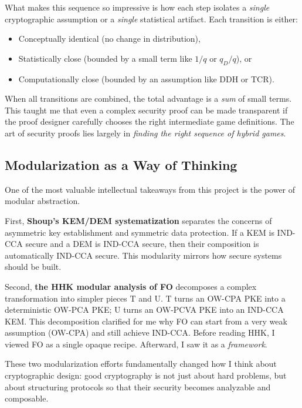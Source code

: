 What makes this sequence so impressive is how each step isolates a \textit{single} cryptographic assumption or a \textit{single} statistical artifact. Each transition is either:
\begin{itemize}
    \item Conceptually identical (no change in distribution),
    \item Statistically close (bounded by a small term like $1/q$ or $q_D/q$), or
    \item Computationally close (bounded by an assumption like DDH or TCR).
\end{itemize}

When all transitions are combined, the total advantage is a \textit{sum} of small terms. This taught me that even a complex security proof can be made transparent if the proof designer carefully chooses the right intermediate game definitions. The art of security proofs lies largely in \textit{finding the right sequence of hybrid games}.

\subsection{Modularization as a Way of Thinking}

One of the most valuable intellectual takeaways from this project is the power of modular abstraction.

First, \textbf{Shoup's KEM/DEM systematization} separates the concerns of asymmetric key establishment and symmetric data protection. If a KEM is IND-CCA secure and a DEM is IND-CCA secure, then their composition is automatically IND-CCA secure. This modularity mirrors how secure systems should be built.

Second, \textbf{the HHK modular analysis of FO} decomposes a complex transformation into simpler pieces $\text{T}$ and $\text{U}$. $\text{T}$ turns an OW-CPA PKE into a deterministic OW-PCA PKE; $\text{U}$ turns an OW-PCVA PKE into an IND-CCA KEM. This decomposition clarified for me why FO can start from a very weak assumption (OW-CPA) and still achieve IND-CCA. Before reading HHK, I viewed FO as a single opaque recipe. Afterward, I saw it as a \textit{framework}.

These two modularization efforts fundamentally changed how I think about cryptographic design: good cryptography is not just about hard problems, but about structuring protocols so that their security becomes analyzable and composable.